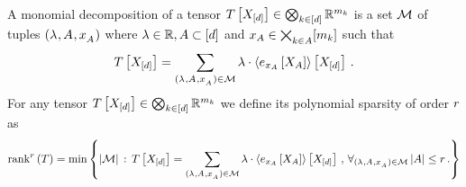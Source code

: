 \begin{definition}
    \label{def:polynomialSparsity}
    A monomial decomposition of a tensor $ T\left[X_{[d]}\right]\in\bigotimes_{k\in[d]} \mathbb{R}^{m_{k}}$ is a set $\mathcal{M}$ of tuples $(\lambda^{}, A^{}, x_{A^{}}^{})$ where $\lambda\in\mathbb{R}, A\subset[d]$ and $x_{A}\in\bigtimes_{k\in A} [m_{k}]$ such that
    \begin{align}
        \label{eq:decIntoMonomials}
        T\left[X_{[d]}\right]
        = \sum_{(\lambda^{}, A^{}, x_{A^{}}^{})\in\mathcal{M}} \lambda \cdot \left\langle e_{x_{A}}\left[X_{A}\right]\right\rangle \left[ X_{[d]} \right] \, .
    \end{align}
    For any tensor $ T\left[X_{[d]}\right]\in\bigotimes_{k\in[d]} \mathbb{R}^{m_{k}}$ we define its polynomial sparsity of order $r$ as
    \begin{align*}
        \mathrm{rank}^{r}\left(T\right) =
        \min \left\{ \left|\mathcal{M}\right| \, : \,
        T\left[X_{[d]}\right] = \sum_{(\lambda^{}, A^{}, x_{A^{}}^{})\in\mathcal{M}} \lambda \cdot \left\langle e_{x_{A}}\left[X_{A}\right]\right\rangle \left[ X_{[d]} \right] \, , \, \forall_{(\lambda^{}, A^{}, x_{A^{}}^{})\in\mathcal{M}} \left|A\right| \leq r \, .
        \right\}
    \end{align*}
\end{definition}


